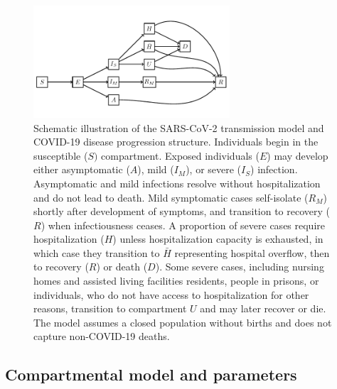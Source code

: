 \documentclass[11pt]{article}
\begin{document}
\begin{figure}
	\begin{center}
		\includegraphics[width=0.65\textwidth]{model_diagram_ct.pdf}
	\end{center}
	\caption{Schematic illustration of the SARS-CoV-2 transmission model and COVID-19 disease progression structure.  Individuals begin in the susceptible ($S)$ compartment. Exposed individuals ($E$) may develop either asymptomatic ($A$), mild ($I_M$), or severe ($I_S$) infection. Asymptomatic and mild infections resolve without hospitalization and do not lead to death. Mild symptomatic cases self-isolate ($R_M$) shortly after development of symptoms, and transition to recovery ($R$) when infectiousness ceases. A proportion of severe cases require hospitalization ($H$) unless hospitalization capacity is exhausted, in which case they transition to $\bar{H}$ representing hospital overflow, then to recovery ($R$) or death ($D$). Some severe cases, including nursing homes and assisted living facilities residents, people in prisons, or individuals, who do not have access to hospitalization for other reasons, transition to compartment $U$ and may later recover or die. The model assumes a closed population without births and does not capture non-COVID-19 deaths.}
	\label{fig:model}
\end{figure}



\subsection{Compartmental model and parameters}
\end{document}
